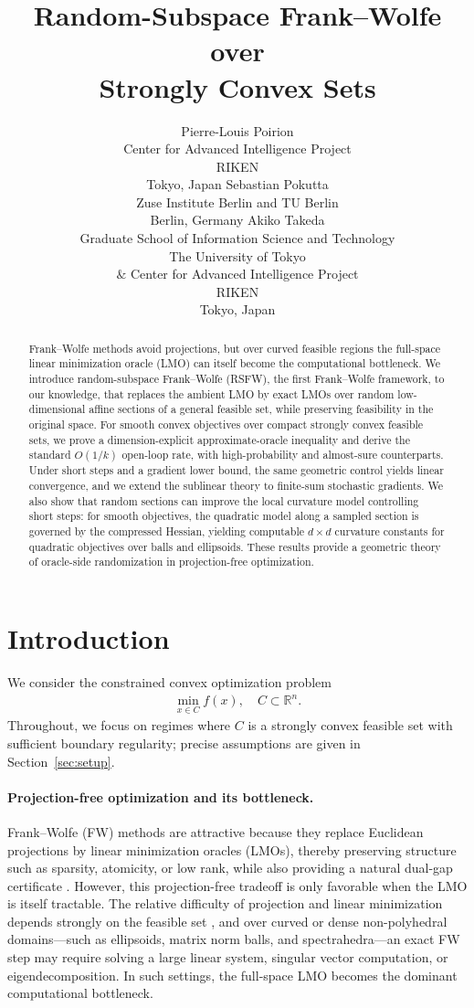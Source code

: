\documentclass{article}
\title{Random-Subspace Frank--Wolfe over \\ Strongly Convex Sets}
\author{
Pierre-Louis Poirion\\
Center for Advanced Intelligence Project\\
RIKEN\\
Tokyo, Japan
\And
Sebastian Pokutta\\
Zuse Institute Berlin and TU Berlin\\
Berlin, Germany
\And
Akiko Takeda\\
Graduate School of Information Science and Technology\\
The University of Tokyo\\
$\&$ Center for Advanced Intelligence Project\\
RIKEN\\
Tokyo, Japan
}
\begin{document}
\maketitle

\begin{abstract}
Frank--Wolfe methods avoid projections, but over curved feasible regions the
full-space linear minimization oracle (LMO) can itself become the computational
bottleneck. We introduce random-subspace Frank--Wolfe (RSFW), the first Frank--Wolfe framework, to our knowledge, that replaces the ambient LMO by exact LMOs
over random low-dimensional affine sections of a general feasible set, while
preserving feasibility in the original space. For smooth convex objectives over
compact strongly convex feasible sets, we prove a dimension-explicit
approximate-oracle inequality and derive the standard \(O(1/k)\) open-loop
rate, with high-probability and almost-sure counterparts. Under short steps and
a gradient lower bound, the same geometric control yields linear convergence,
and we extend the sublinear theory to finite-sum stochastic gradients. We also
show that random sections can improve the local curvature model controlling
short steps: for smooth objectives, the quadratic model along a sampled section
is governed by the compressed Hessian, yielding computable \(d\times d\)
curvature constants for quadratic objectives over balls and ellipsoids. These
results provide a geometric theory of oracle-side randomization in
projection-free optimization.
\end{abstract}
\section{Introduction}
We consider the constrained convex optimization problem
\begin{align}
\min_{x \in C} f(x), \quad C \subset \mathbb{R}^n.
\label{optprob}
\end{align}
Throughout, we focus on regimes where \(C\) is a strongly convex
feasible set with sufficient boundary regularity; precise assumptions are given in Section~\ref{sec:setup}.

\paragraph{Projection-free optimization and its bottleneck.}
Frank--Wolfe (FW) methods are attractive because they replace Euclidean
projections by linear minimization oracles (LMOs), thereby preserving structure
such as sparsity, atomicity, or low rank, while also providing a natural
dual-gap certificate \cite{FrankWolfe1956,Jaggi2013FW}. However, this
projection-free tradeoff is only favorable when the LMO is itself tractable.
The relative difficulty of projection and linear minimization depends strongly
on the feasible set \cite{CombettesPokutta2021Complexity}, and over curved or
dense non-polyhedral domains---such as ellipsoids, matrix norm balls, and
spectrahedra---an exact FW step may require solving a large linear system,
singular vector computation, or eigendecomposition. In such settings, the
full-space LMO becomes the dominant computational bottleneck.
\end{document}
